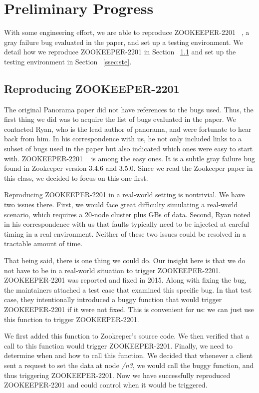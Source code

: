 \section{Preliminary Progress}
With some engineering effort, we are able to reproduce ZOOKEEPER-2201 ~\cite{httpsiss99:online}, a gray failure bug evaluated in the paper, and set up a testing environment. We detail how we reproduce ZOOKEEPER-2201 in Section ~\ref{ssec:rob} and set up the testing environment in Section ~\ref{ssec:ste}.

\subsection{Reproducing ZOOKEEPER-2201}
\label{ssec:rob}
The original Panorama paper did not have references to the bugs used. Thus, 
the first thing we did was to acquire the list of bugs evaluated in the paper. We contacted Ryan, who is the lead author of panorama, and were fortunate to hear back from him. In his correspondence with us, he not only included links to a subset of bugs used in the paper but also indicated which ones were easy to start with. ZOOKEEPER-2201 ~\cite{httpsiss99:online} is among the easy ones. It is a subtle gray failure bug found in Zookeeper version 3.4.6 and 3.5.0. Since we read the Zookeeper paper in this class, we decided to focus on this one first.

Reproducing ZOOKEEPER-2201 in a real-world setting is nontrivial. We have two issues there. First, we would face great difficulty simulating a real-world scenario, which requires a 20-node cluster plus GBs of data. Second, Ryan noted in his correspondence with us that faults typically need to be injected at careful timing in a real environment. Neither of these two issues could be resolved in a tractable amount of time. 

That being said, there is one thing we could do. Our insight here is that we do not have to be in a real-world situation to trigger ZOOKEEPER-2201. ZOOKEEPER-2201 was reported and fixed in 2015. Along with fixing the bug, the maintainers attached a test case that examined this specific bug. In that test case, they intentionally introduced a buggy function that would trigger ZOOKEEPER-2201 if it were not fixed. This is convenient for us: we can just use this function to trigger ZOOKEEPER-2201. 

We first added this function to Zookeeper's source code. We then verified that a call to this function would trigger ZOOKEEPER-2201. Finally, we need to determine when and how to call this function. We decided that whenever a client sent a request to set the data at node \textit{/n3}, we would call the buggy function, and thus triggering ZOOKEEPER-2201. Now we have successfully reproduced ZOOKEEPER-2201 and could control when it would be triggered.


